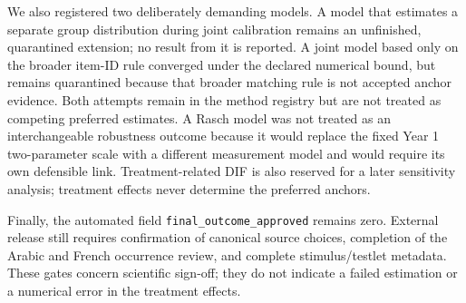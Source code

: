 We also registered two deliberately demanding models. A model that estimates a
separate group distribution during joint calibration remains an unfinished,
quarantined extension; no result from it is reported. A joint model based only
on the broader item-ID rule
converged under the declared numerical bound, but remains quarantined because
that broader matching rule is not accepted anchor evidence. Both attempts
remain in the method registry but are not treated as competing preferred estimates.
A Rasch model was not treated as an
interchangeable robustness outcome because it would replace the fixed Year 1
two-parameter scale with a different measurement model and would require its
own defensible link. Treatment-related DIF is also reserved for a later
sensitivity analysis; treatment effects never determine the preferred anchors.

Finally, the automated field \texttt{final\_outcome\_approved} remains zero.
External release still requires confirmation of canonical source choices,
completion of the Arabic and French occurrence review, and complete
stimulus/testlet metadata. These gates concern scientific sign-off; they do not
indicate a failed estimation or a numerical error in the treatment effects.

\clearpage
\begin{landscape}

\end{landscape}

\clearpage
\begin{landscape}

\end{landscape}

\clearpage


\clearpage

